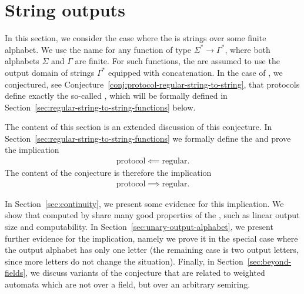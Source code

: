 \section{String outputs}
\label{sec:string-outputs}
\AP
In this section, we consider the case where the  is strings over
some finite alphabet. We use the name  for any
function of type $\Sigma^* \to \Gamma^*$, where both alphabets $\Sigma$ and
$\Gamma$ are finite. For such functions, the  are assumed to use the
output domain of strings $\Gamma^*$ equipped with concatenation. In the case of
, we conjectured, see
Conjecture~\ref{conj:protocol-regular-string-to-string},  that protocols define
exactly the so-called , which will be formally defined in
Section~\ref{sec:regular-string-to-string-functions} below.
 


The content of this section is an extended discussion of this conjecture.
In Section~\ref{sec:regular-string-to-string-functions} we  formally
define the  and  prove the implication 
\begin{align*}
\text{protocol} \impliedby \text{regular}.
\end{align*}
The content of the conjecture is therefore the implication 
\begin{align*}
\text{protocol} \implies \text{regular}.
\end{align*}

In Section~\ref{sec:continuity}, we present some evidence for this implication.
We show that  computed by  share
many good properties of the , such as linear output size
and computability. In Section~\ref{sec:unary-output-alphabet}, we present
further evidence for the implication, namely we  prove it in the special case
where the output alphabet has only one letter (the remaining case is two output
letters, since more letters do not change the situation). Finally, in
Section~\ref{sec:beyond-fields}, we discuss variants of the conjecture that are
related to weighted automata which are not over a field, but over an arbitrary
semiring. 




% 

